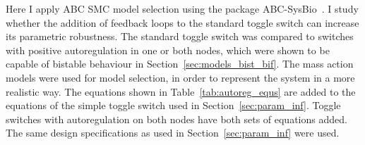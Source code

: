     


Here I apply ABC SMC model selection using the package ABC-SysBio~\autocite{Liepe:2010eg}. I study whether the addition of feedback loops to the standard toggle switch can increase its parametric robustness. The standard toggle switch was compared to switches with positive autoregulation in one or both nodes, which were shown to be capable of bistable behaviour in Section~\ref{sec:models_bist_bif}. The mass action models were used for model selection, in order to represent the system in a more realistic way. The equations shown in Table~\ref{tab:autoreg_equs} are added to the equations of the simple toggle switch used in Section~\ref{sec:param_inf}. Toggle switches with autoregulation on both nodes have both sets of equations added. The same design specifications as used in Section~\ref{sec:param_inf} were used.



